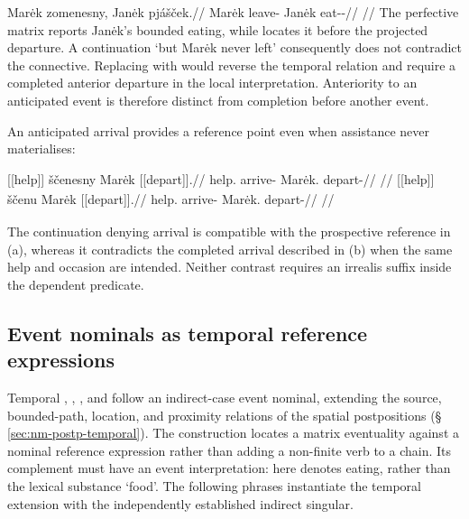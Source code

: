 \ex\label{ex:prospective-before}%
\begingl
\gla Marėk zomenesny, Janėk pjášček.//
\glb Marėk leave-\Cv{} Janėk eat-\Antip{}-\Pf{}//
\glft {}
//
\endgl
\xe
The perfective matrix reports Janėk's bounded eating, while 
locates it before the projected departure. A continuation `but Marėk never
left' consequently does not contradict the connective. Replacing 
with  would reverse the temporal relation and require a completed
anterior departure in the local interpretation. Anteriority to an anticipated
event is therefore distinct from completion before another event.

An anticipated arrival provides a reference point even when assistance
never materialises:

\pex\label{ex:slot-before-help}
\a
\begingl
\gla \textnormal{[[help]]}\textsubscript{\Dir{}} ščenesny Marėk \textnormal{[[depart]]}\textsubscript{\Pf{}}.//
\glb help.\Dir{} arrive-\Cv{} Marėk.\Dir{} depart-\Pf{}//
\glft {}
//
\endgl
\a
\begingl
\gla \textnormal{[[help]]}\textsubscript{\Dir{}} ščenu Marėk \textnormal{[[depart]]}\textsubscript{\Pf{}}.//
\glb help.\Dir{} arrive-\Seq{} Marėk.\Dir{} depart-\Pf{}//
\glft {}
//
\endgl
\xe

The continuation denying arrival is compatible with the prospective
reference in (a), whereas it contradicts the completed arrival described in
(b) when the same help and occasion are intended. Neither contrast requires
an irrealis suffix inside the dependent predicate.

\subsection{Event nominals as temporal reference expressions}
\label{sec:temporal-event-nominals}

Temporal , , , and  follow an indirect-case
event nominal, extending the source, bounded-path, location, and proximity
relations of the spatial postpositions (§\,\ref{sec:nm-postp-temporal}).
The construction locates a matrix eventuality against a nominal reference
expression rather than adding a non-finite verb to a chain. Its complement
must have an event interpretation:  here denotes eating, rather
than the lexical substance `food'. The following phrases instantiate the
temporal extension with the independently established indirect singular.

